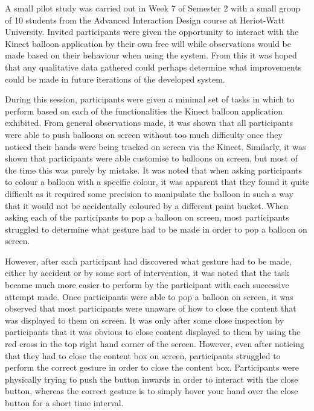 
A small pilot study was carried out in Week 7 of Semester 2 with a small group of 10 students from the Advanced Interaction Design course at Heriot-Watt University. Invited participants were given the opportunity to interact with the Kinect balloon application by their own free will while observations would be made based on their behaviour when using the system. From this it was hoped that any qualitative data gathered could perhaps determine what improvements could be made in future iterations of the developed system.

During this session, participants were given a minimal set of tasks in which to perform based on each of the functionalities the Kinect balloon application exhibited. From general observations made, it was shown that all participants were able to push balloons on screen without too much difficulty once they noticed their hands were being tracked on screen via the Kinect. Similarly, it was shown that participants were able customise to balloons on screen, but most of the time this was purely by mistake. It was noted that when asking participants to colour a balloon with a specific colour, it was apparent that they found it quite difficult as it required some precision to manipulate the balloon in such a way that it would not be accidentally coloured by a different paint bucket. When asking each of the participants to pop a balloon on screen, most participants struggled to determine what gesture had to be made in order to pop a balloon on screen. 

However, after each participant had discovered what gesture had to be made, either by accident or by some sort of intervention, it was noted that the task became much more easier to perform by the participant with each successive attempt made. Once participants were able to pop a balloon on screen, it was observed that most participants were unaware of how to close the content that was displayed to them on screen. It was only after some close inspection by participants that it was obvious to close content displayed to them by using the red cross in the top right hand corner of the screen. However, even after noticing that they had to close the content box on screen, participants struggled to perform the correct gesture in order to close the content box. Participants were physically trying to push the button inwards in order to interact with the close button, whereas the correct gesture is to simply hover your hand over the close button for a short time interval.


